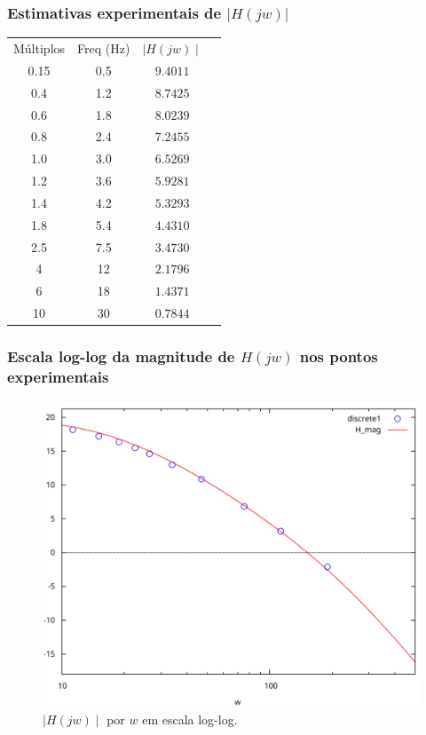 \documentclass[12pt,twoside, a4paper, twocolumn]{article}
\begin{document}
\subsubsection{Estimativas experimentais de $ | H(jw) | $}


\begin{center}
    \begin{tabular}{ |c|c|c|c| }
        \hline
        Múltiplos & Freq (Hz) & $\mid H(jw) \mid$ \\
        0.15      & 0.5       & $9.4011$          \\
        0.4       & 1.2       & $8.7425$          \\
        0.6       & 1.8       & $8.0239$          \\
        0.8       & 2.4       & $7.2455$          \\
        1.0       & 3.0       & $6.5269$          \\
        1.2       & 3.6       & $5.9281$          \\
        1.4       & 4.2       & $5.3293$          \\
        1.8       & 5.4       & $4.4310$          \\
        2.5       & 7.5       & $3.4730$          \\
        4         & 12        & $2.1796$          \\
        6         & 18        & $1.4371$          \\
        10        & 30        & $0.7844$          \\
        \hline
    \end{tabular}
\end{center}


\subsubsection*{Escala log-log da magnitude de $H(jw)$ nos pontos experimentais}


\begin{figure}[h]
    \centering
    \includegraphics[width=1\columnwidth]{images/H1loglog.png}
    \caption{ $\mid H(jw) \mid$ por $w$ em escala log-log.}
\end{figure}
\end{document}
